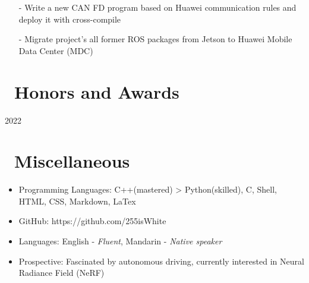 \documentclass{resume}
\begin{document}
\begin{itemize}
  \item[-] Write a new CAN FD program based on Huawei communication rules and deploy it with cross-compile
  \item[-] Migrate project's all former ROS packages from Jetson to Huawei Mobile Data Center (MDC)
\end{itemize}


\section{\faTrophy\ Honors and Awards}
 {2022}

\section{\faCogs\ Miscellaneous}
\begin{itemize}[parsep=0.5ex]
  \item Programming Languages: C++(mastered) > Python(skilled), C, Shell, HTML, CSS, Markdown, LaTex
  \item GitHub: https://github.com/255isWhite
  \item Languages: English - \textit{Fluent}, Mandarin - \textit{Native speaker}
  \item Prospective: Fascinated by autonomous driving, currently interested in Neural Radiance Field (NeRF)
\end{itemize}

%
%
\end{document}
